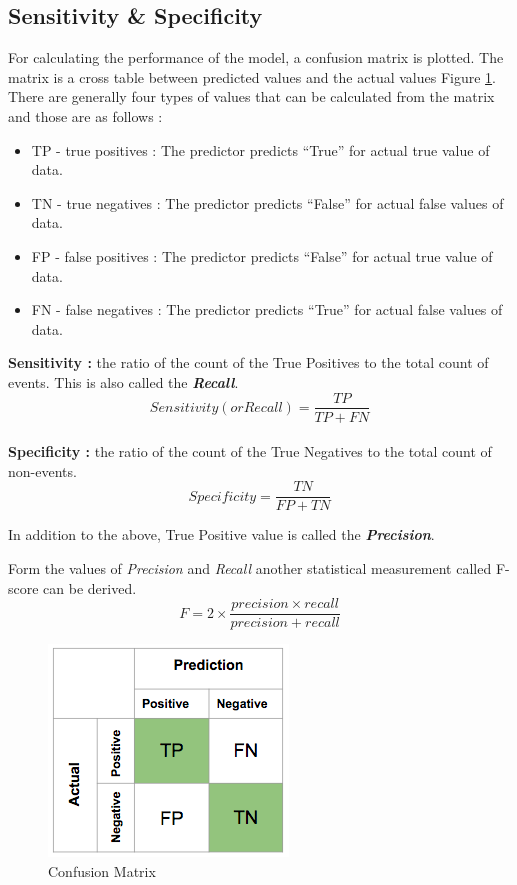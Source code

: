 \subsection{Sensitivity \& Specificity}
For calculating the performance of the model, a confusion matrix is plotted. The matrix is a cross table between predicted values and the actual values Figure \ref{fig:ConfusionMatrix}.  There are generally four types of values that can be calculated from the matrix and those are as follows :
\begin{itemize}
	\item TP - true positives : The predictor predicts ``True'' for actual true value of data. 
	\item TN - true negatives : The predictor predicts ``False'' for actual false values of data. 
	\item FP - false positives : The predictor predicts ``False'' for actual true value of data.
	\item FN - false negatives : The predictor predicts ``True'' for actual false values of data.
\end{itemize}

\textbf{Sensitivity :} the ratio of the count of the True Positives to the total count of events. This is also called the \textit{\textbf{Recall}}.
\[
	Sensitivity(or Recall) = \frac{TP}{TP+FN}
\]
\\
\textbf{Specificity :} the ratio of the count of the True Negatives to the total count of non-events.
\[
Specificity = \frac{TN}{FP+TN}
\]

In addition to the above, True Positive value is called the \textit{\textbf{Precision}}. 

Form the values of \textit{Precision} and \textit{Recall} another statistical measurement called F-score can be derived.
\[
	F = 2 \times \frac{precision \times recall}{precision + recall}
\]

\begin{figure}[h]
	\includegraphics[scale=0.7]{figures/confusionmatrix.png}
	\centering
	\caption{Confusion Matrix}
	\label{fig:ConfusionMatrix}
\end{figure}





